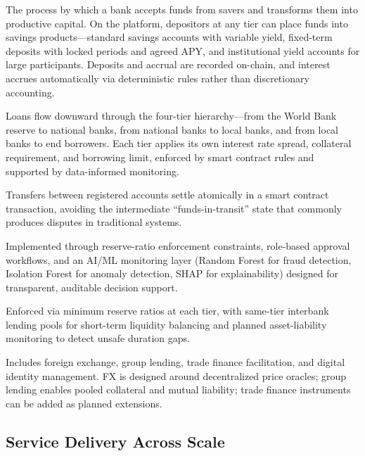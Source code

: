 \documentclass[12pt,a4paper]{report}
\begin{document}
\begin{description}[leftmargin=0pt]
\item[\textbf{Deposit Mobilization.}] The process by which a bank accepts funds from savers and transforms them into productive capital. On the platform, depositors at any tier can place funds into savings products---standard savings accounts with variable yield, fixed-term deposits with locked periods and agreed APY, and institutional yield accounts for large participants. Deposits and accrual are recorded on-chain, and interest accrues automatically via deterministic rules rather than discretionary accounting.
\item[\textbf{Credit Allocation.}] Loans flow downward through the four-tier hierarchy---from the World Bank reserve to national banks, from national banks to local banks, and from local banks to end borrowers. Each tier applies its own interest rate spread, collateral requirement, and borrowing limit, enforced by smart contract rules and supported by data-informed monitoring.
\item[\textbf{Payment and Settlement.}] Transfers between registered accounts settle atomically in a smart contract transaction, avoiding the intermediate ``funds-in-transit'' state that commonly produces disputes in traditional systems.
\item[\textbf{Risk Intermediation.}] Implemented through reserve-ratio enforcement constraints, role-based approval workflows, and an AI/ML monitoring layer (Random Forest for fraud detection, Isolation Forest for anomaly detection, SHAP for explainability) designed for transparent, auditable decision support.
\item[\textbf{Liquidity Management.}] Enforced via minimum reserve ratios at each tier, with same-tier interbank lending pools for short-term liquidity balancing and planned asset-liability monitoring to detect unsafe duration gaps.
\item[\textbf{Ancillary Financial Services.}] Includes foreign exchange, group lending, trade finance facilitation, and digital identity management. FX is designed around decentralized price oracles; group lending enables pooled collateral and mutual liability; trade finance instruments can be added as planned extensions.
\end{description}

\subsection{Service Delivery Across Scale}
\end{document}

